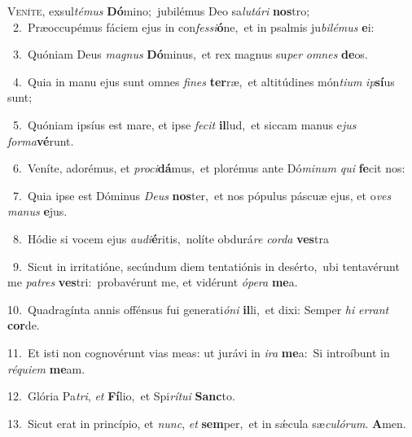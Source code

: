 \lettrine{\initial\textcolor{\initialcolor}{V}}{eníte,} exsul\-\textit{té}\-\textit{mus} \textbf{Dó}\-mino;~\star jubilémus Deo sa\-\textit{lu}\-\textit{tá}\textit{ri} \textbf{nos}\-tro;\\
{\numbfont\textcolor{\numbcolor}{~2.}}~Præoccupémus fáciem ejus in con\-\textit{fes}\-\textit{si}\textbf{ó}ne,~\star et in psalmis ju\-\textit{bi}\-\textit{lé}\textit{mus} \textbf{e}\-i:\par
{\numbfont\textcolor{\numbcolor}{~3.}}~Quóniam Deus \textit{ma}\-\textit{gnus} \textbf{Dó}\-minus,~\star et rex magnus su\textit{per} \textit{om}\-\textit{nes} \textbf{de}\-os.\par
{\numbfont\textcolor{\numbcolor}{~4.}}~Quia in manu ejus sunt omnes \textit{fi}\-\textit{nes} \textbf{ter}\-ræ,~\star et altitúdines món\-\textit{ti}\-\textit{um} \textit{ip}\-\textbf{sí}us sunt;\par
{\numbfont\textcolor{\numbcolor}{~5.}}~Quóniam ipsíus est mare, et ipse \textit{fe}\-\textit{cit} \textbf{il}\-lud,~\star et siccam manus e\textit{jus} \textit{for}\-\textit{ma}\textbf{vé}runt.\par
{\numbfont\textcolor{\numbcolor}{~6.}}~Veníte, adorémus, et \textit{pro}\-\textit{ci}\textbf{dá}mus,~\star et plorémus ante Dó\-\textit{mi}\-\textit{num} \textit{qui} \textbf{fe}\-cit nos:\par
{\numbfont\textcolor{\numbcolor}{~7.}}~Quia ipse est Dóminus \textit{De}\-\textit{us} \textbf{nos}\-ter,~\star et nos pópulus páscuæ ejus, et o\textit{ves} \textit{ma}\-\textit{nus} \textbf{e}\-jus.\par
{\numbfont\textcolor{\numbcolor}{~8.}}~Hódie si vocem ejus \textit{au}\-\textit{di}\textbf{é}ritis,~\star nolíte obdurá\textit{re} \textit{cor}\-\textit{da} \textbf{ves}\-tra\par
{\numbfont\textcolor{\numbcolor}{~9.}}~Sicut in irritatióne, secúndum diem tentatiónis in desérto,~\dagger ubi tentavérunt me \textit{pa}\-\textit{tres} \textbf{ves}\-tri:~\star probavérunt me, et vidérunt \textit{ó}\-\textit{pe}\textit{ra} \textbf{me}\-a.\par
{\numbfont\textcolor{\numbcolor}{10.}}~Quadragínta annis offénsus fui generati\-\textit{ó}\-\textit{ni} \textbf{il}\-li,~\star et dixi: Semper \textit{hi} \textit{er}\-\textit{rant} \textbf{cor}\-de.\par
{\numbfont\textcolor{\numbcolor}{11.}}~Et isti non cognovérunt vias meas: ut jurávi in \textit{i}\-\textit{ra} \textbf{me}\-a:~\star Si introíbunt in \textit{ré}\-\textit{qui}\textit{em} \textbf{me}\-am.\par
{\numbfont\textcolor{\numbcolor}{12.}}~Glória Pa\-\textit{tri}\-, \textit{et} \textbf{Fí}\-lio,~\star et Spi\-\textit{rí}\-\textit{tu}\textit{i} \textbf{Sanc}\-to.\par
{\numbfont\textcolor{\numbcolor}{13.}}~Sicut erat in princípio, et \textit{nunc}\-, \textit{et} \textbf{sem}\-per,~\star et in sǽcula sæ\-\textit{cu}\-\textit{ló}\textit{rum}. \textbf{A}\-men.\par
